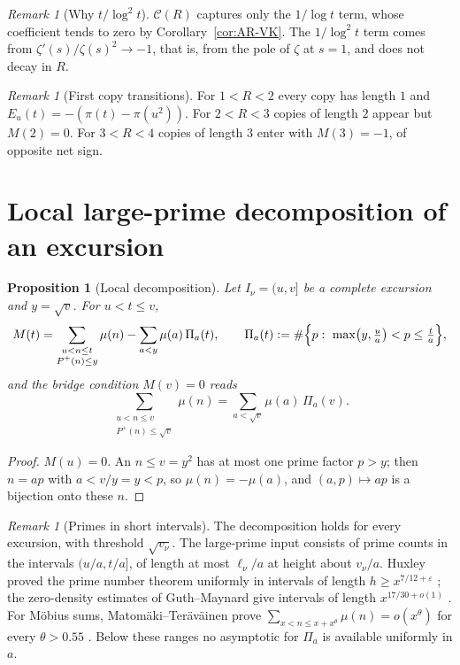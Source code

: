\documentclass[11pt]{amsart}
\numberwithin{equation}{section}
\theoremstyle{plain}
\newtheorem{proposition}[theorem]{Proposition}
\theoremstyle{definition}
\theoremstyle{remark}
\newtheorem{remark}[theorem]{Remark}
\newcommand{\eps}{\varepsilon}
\newcommand{\Pp}{P^{+}}
\newcommand{\Cc}{\mathcal{C}}
\begin{document}
\begin{remark}[Why $t/\log^2t$]
\label{rem:why_log2}
$\Cc(R)$ captures only the $1/\log t$ term, whose coefficient tends to zero
by Corollary~\ref{cor:AR-VK}. The $1/\log^2t$ term comes from
$\zeta'(s)/\zeta(s)^2\to-1$, that is, from the pole of $\zeta$ at $s=1$,
and does not decay in $R$.
\end{remark}

\begin{remark}[First copy transitions]
\label{rem:first-copy-transitions}
For $1<R<2$ every copy has length $1$ and $E_u(t)=-(\pi(t)-\pi(u^2))$. For
$2<R<3$ copies of length $2$ appear but $M(2)=0$. For $3<R<4$ copies of
length $3$ enter with $M(3)=-1$, of opposite net sign.
\end{remark}

\section{Local large-prime decomposition of an excursion}
\label{sec:local_large_prime}

\begin{proposition}[Local decomposition]
\label{prop:local_large_prime}
Let $I_\nu=(u,v]$ be a complete excursion and $y=\sqrt v$. For $u<t\le v$,
\begin{equation}
\label{eq:local_split}
  M(t)=\sum_{\substack{u<n\le t\\ \Pp(n)\le y}}\mu(n)
  -\sum_{a<y}\mu(a)\,\Pi_a(t),\qquad
  \Pi_a(t):=\#\Bigl\{p:\ \max\bigl(y,\tfrac ua\bigr)<p\le\tfrac ta\Bigr\},
\end{equation}
and the bridge condition $M(v)=0$ reads
\begin{equation}
\label{eq:local_bridge}
  \sum_{\substack{u<n\le v\\ \Pp(n)\le\sqrt v}}\mu(n)
  =\sum_{a<\sqrt v}\mu(a)\,\Pi_a(v).
\end{equation}
\end{proposition}

\begin{proof}
$M(u)=0$. An $n\le v=y^2$ has at most one prime factor $p>y$; then
$n=ap$ with $a<v/y=y<p$, so $\mu(n)=-\mu(a)$, and $(a,p)\mapsto ap$ is a
bijection onto these $n$.
\end{proof}

\begin{remark}[Primes in short intervals]
\label{rem:local_meaning}
The decomposition holds for every excursion, with threshold $\sqrt{v_\nu}$.
The large-prime input consists of prime counts in the intervals
$(u/a,t/a]$, of length at most $\ell_\nu/a$ at height about $v_\nu/a$.
Huxley proved the prime number theorem uniformly in intervals of length
$h\ge x^{7/12+\eps}$ \cite{Huxley1972}; the zero-density estimates of
Guth--Maynard give intervals of length $x^{17/30+o(1)}$
\cite{GuthMaynard2024}. For M\"obius sums, Matom\"aki--Ter\"av\"ainen prove
$\sum_{x<n\le x+x^\theta}\mu(n)=o(x^\theta)$ for every $\theta>0.55$
\cite{MatomakiTeravainen2023}. Below these ranges no asymptotic for
$\Pi_a$ is available uniformly in $a$.
\end{remark}
\end{document}
